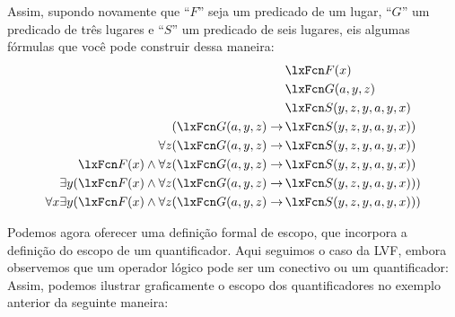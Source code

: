 Assim, supondo novamente que \textquotedblleft $F$\textquotedblright{} seja um predicado de um lugar, \textquotedblleft $G$\textquotedblright{} um predicado de três lugares e \textquotedblleft $S$\textquotedblright{} um predicado de seis lugares, eis algumas fórmulas que você pode construir dessa maneira:
	\begin{align*}
		& \atom{F}{x}\\
		& \atom{G}{a,y,z}\\
		& \atom{S}{y,z,y,a,y,x}\\
		(\atom{G}{a,y,z} \eif \,& \atom{S}{y,z,y,a,y,x})\\
		\forall z (\atom{G}{a,y,z} \eif \,& \atom{S}{y,z,y,a,y,x})\\
		\atom{F}{x} \eand \forall z (\atom{G}{a,y,z} \eif \,& \atom{S}{y,z,y,a,y,x})\\
		\exists y (\atom{F}{x} \eand \forall z (\atom{G}{a,y,z} \eif \,& \atom{S}{y,z,y,a,y,x}))\\
		\forall x \exists y (\atom{F}{x} \eand \forall z (\atom{G}{a,y,z} \eif \,& \atom{S}{y,z,y,a,y,x}))
	\end{align*}

Podemos agora oferecer uma definição formal de escopo, que incorpora a definição do escopo de um quantificador. Aqui seguimos o caso da LVF, embora observemos que um operador lógico pode ser um conectivo ou um quantificador:
Assim, podemos ilustrar graficamente o escopo dos quantificadores no exemplo anterior da seguinte maneira:

